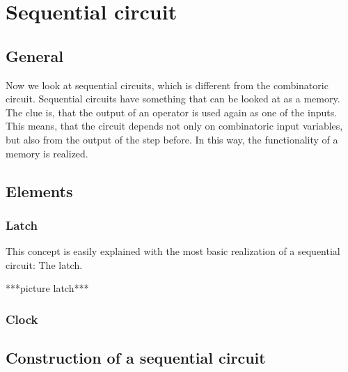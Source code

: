                                                        
\section{Sequential circuit}                           
\subsection{General}
Now we look at sequential circuits, which is different from the combinatoric circuit. Sequential circuits have something that can be looked at as a memory. The clue is, that the output of an operator is used again as one of the inputs. This means, that the circuit depends not only on combinatoric input variables, but also from the output of the step before. In this way, the functionality of a memory is realized. 

\subsection{Elements}
\subsubsection{Latch}
This concept is easily explained with the most basic realization of a sequential circuit: The latch. 

***picture latch***


\subsubsection{Clock}
\subsection{Construction of a sequential circuit}
